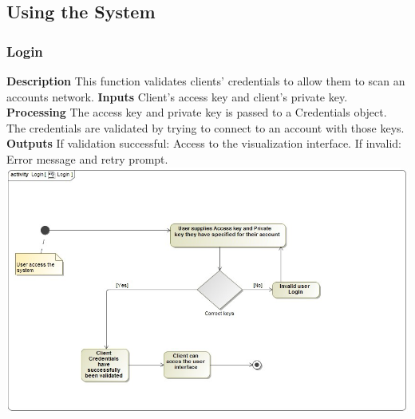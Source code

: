 \documentclass[hidelinks,a4paper,12pt]{article}
\begin{document}
\subsection{Using the System}		
	\subsubsection{Login}
	\textbf{Description}
	\newline
	This function validates clients' credentials to allow them to scan an accounts network.
	\textbf{Inputs}
	\newline
	Client’s access key and client’s private key.
	\newline
	\textbf{Processing}
	\newline
	The access key and private key is passed to a Credentials object. The credentials are validated by
	trying to connect to an account with those keys.
	\newline
	\textbf{Outputs}
	\newline
	If validation successful:
	\newline
	Access to the visualization interface.
	\newline
	If invalid:
	\newline
	Error message and retry prompt.
	\newline
	\includegraphics[width=1.00\textwidth]{./images/Login.png}\\[0.4cm] 
	\newpage	
\end{document}

